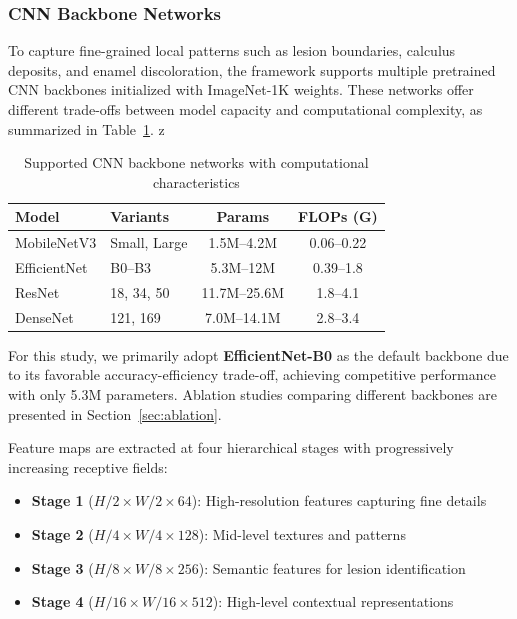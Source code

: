 \subsubsection{CNN Backbone Networks}
\label{subsubsec:cnn_backbone}

To capture fine-grained local patterns such as lesion boundaries, calculus deposits, and enamel discoloration, the framework supports multiple pretrained CNN backbones initialized with ImageNet-1K weights. These networks offer different trade-offs between model capacity and computational complexity, as summarized in Table~\ref{tab:backbones}.
z
\begin{table}[htbp]
\centering
\caption{Supported CNN backbone networks with computational characteristics}
\label{tab:backbones}
\small
\begin{tabular}{llcc}
\toprule
\textbf{Model} & \textbf{Variants} & \textbf{Params} & \textbf{FLOPs (G)} \\
\midrule
MobileNetV3 & Small, Large & 1.5M--4.2M & 0.06--0.22 \\
EfficientNet & B0--B3 & 5.3M--12M & 0.39--1.8 \\
ResNet & 18, 34, 50 & 11.7M--25.6M & 1.8--4.1 \\
DenseNet & 121, 169 & 7.0M--14.1M & 2.8--3.4 \\
\bottomrule
\end{tabular}
\end{table}


For this study, we primarily adopt \textbf{EfficientNet-B0} as the default backbone due to its favorable accuracy-efficiency trade-off, achieving competitive performance with only 5.3M parameters. Ablation studies comparing different backbones are presented in Section~\ref{sec:ablation}.

Feature maps are extracted at four hierarchical stages with progressively increasing receptive fields:
\begin{itemize}
    \item \textbf{Stage 1} ($H/2 \times W/2 \times 64$): High-resolution features capturing fine details
    \item \textbf{Stage 2} ($H/4 \times W/4 \times 128$): Mid-level textures and patterns
    \item \textbf{Stage 3} ($H/8 \times W/8 \times 256$): Semantic features for lesion identification
    \item \textbf{Stage 4} ($H/16 \times W/16 \times 512$): High-level contextual representations
\end{itemize}

